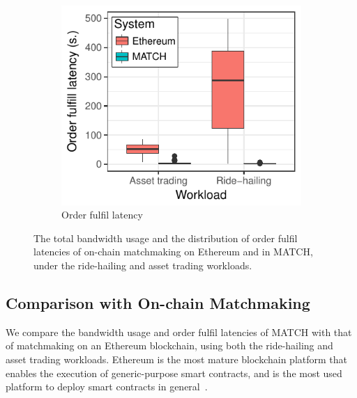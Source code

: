 \begin{figure}[t!]
\begin{subfigure}{.5\columnwidth}
		\label{fig:ethereum_memory}
	\end{subfigure}
	\begin{subfigure}{.5\columnwidth}
		\centering
		\includegraphics[width=\columnwidth]{match/assets/plots/ethereum_experiment_latencies.pdf}
		\caption{Order fulfil latency}
		\label{fig:ethereum_latencies}
	\end{subfigure}
	\caption{The total bandwidth usage and the distribution of order fulfil latencies of on-chain matchmaking on Ethereum and in MATCH, under the ride-hailing and asset trading workloads.}
	\label{fig:ethereum_experiments}
\end{figure}

\subsection{Comparison with On-chain Matchmaking}
\label{sec:experiments_ethereum}
We compare the bandwidth usage and order fulfil latencies of MATCH with that of matchmaking on an Ethereum blockchain, using both the ride-hailing and asset trading workloads.
Ethereum is the most mature blockchain platform that enables the execution of generic-purpose smart contracts, and is the most used platform to deploy smart contracts in general~\cite{wood2014ethereum}.

